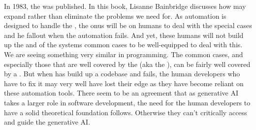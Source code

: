 In 1983, the  was published\cite{BAINBRIDGE1983775}. In this book, Lisanne Bainbridge discusses how  may expand rather than eliminate the problems we need  for. As automation is designed to handle the , the onus will be on humans to deal with the special cases and he fallout when the automation fails. And yet, these humans will not build up the  and  of the systems common cases to be well-equipped to deal with this. We are seeing something very similar in programming. The common cases, and especially those that are well covered by the  (aka the ), can be fairly well covered by a . But when has build up a  codebase and fails, the human developers who have to fix it may very well have lost their edge as they have become reliant on these automation tools. There seem to be an agreement that as generative AI takes a larger role in software development, the need for the human developers to have a solid theoretical foundation follows. Otherwise they can't critically access and guide the generative AI.


